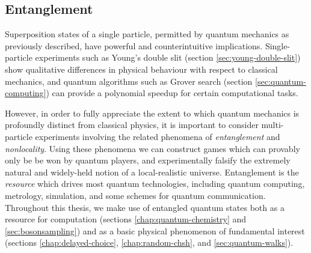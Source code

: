 \subsection{Entanglement}
\label{sec:entanglement}
Superposition states of a single particle, permitted by quantum mechanics as previously described, have powerful and counterintuitive implications.  Single-particle experiments such as Young's double slit (section \ref{sec:young-double-slit})  show qualitative differences in physical behaviour with respect to classical mechanics, 
and quantum algorithms such as Grover search (section \ref{sec:quantum-computing}) can provide a polynomial speedup for certain computational tasks.  

However, in order to fully appreciate the extent to which quantum mechanics is profoundly distinct from classical physics, it is important to consider multi-particle experiments involving the related phenomena of \emph{entanglement} and \emph{nonlocality}. Using these phenomena we can construct games which can provably only be be won by quantum players, and experimentally falsify the extremely natural and widely-held notion of a local-realistic universe.  Entanglement is the \emph{resource} which drives most quantum technologies, including quantum computing, metrology, simulation, and some schemes for quantum communication.  Throughout this thesis, we make use of entangled quantum states both as a resource for computation (sections \ref{chap:quantum-chemistry} and \ref{sec:bosonsampling}) and as a basic physical phenomenon of fundamental interest (sections \ref{chap:delayed-choice}, \ref{chap:random-chsh}, and \ref{sec:quantum-walks}).

